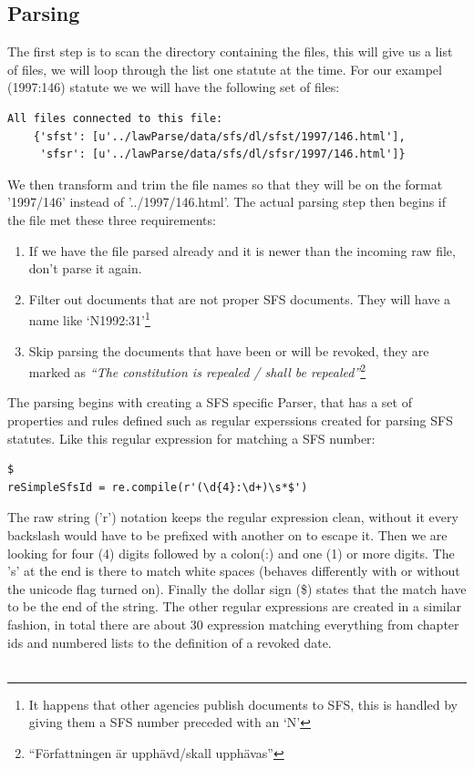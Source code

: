 \subsection{Parsing}

The first step is to scan the directory containing the files, this will give us a list of files, we will loop through the list one statute at the time. For our exampel (1997:146) statute we we will have the following set of files:\\ 
\begin{verbatim}
All files connected to this file: 
	{'sfst': [u'../lawParse/data/sfs/dl/sfst/1997/146.html'], 
	 'sfsr': [u'../lawParse/data/sfs/dl/sfsr/1997/146.html']}
\end{verbatim}
\linebreak
We then transform and trim the file names so that they will be on the format '1997/146' instead of '../1997/146.html'. The actual parsing step then begins if the file met these three requirements:
\begin{enumerate}
\item If we have the file parsed already and it is newer than the incoming raw file, don't parse it again.
\item Filter out documents that are not proper SFS documents. They will have a name like ‘N1992:31’\footnote{It happens that other agencies publish documents to SFS, this is handled by giving them a SFS number preceded with an ‘N’}
\item Skip parsing the documents that have been or will be revoked, they are marked as \textit{“The constitution is repealed / shall be repealed”}\footnote{“Författningen är upphävd/skall upphävas”}
\end{enumerate}
The parsing begins with creating a SFS specific Parser, that has a set of properties and rules defined such as regular experssions created for parsing SFS statutes. Like this regular expression for matching a SFS number:\\
\begin{verbatim}
$
reSimpleSfsId = re.compile(r'(\d{4}:\d+)\s*$')
\end{verbatim}
\linebreak
The raw string ('r') notation keeps the regular expression clean, without it every backslash would have to be prefixed with another on to escape it. Then we are looking for four (4) digits followed by a colon(:) and one (1) or more digits. The 's' at the end is there to match white spaces (behaves differently with or without the unicode flag turned on). Finally the dollar sign (\$) states that the match have to be the end of the string. The other regular expressions are created in a similar fashion, in total there are about 30 expression matching everything from chapter ids and numbered lists to the definition of a revoked date.\cite{regexpBib}\\\\  
